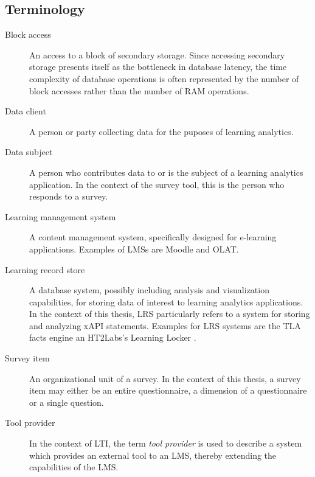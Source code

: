 \subsection{Terminology}
\begin{description}
	\item[Block access] 
		An access to a block of secondary storage. Since accessing secondary storage
		presents itself as the bottleneck in database latency, the time complexity of
		database operations is often represented by the number of block accesses rather
		than the number of RAM operations.
    \item[Data client]
    	A person or party collecting data for the puposes of learning analytics.
    \item[Data subject]
    	A person who contributes data to or is the subject of a learning analytics 
    	application. In the context of the survey tool, this is the person who
    	responds to a survey.
    \item[Learning management system]
	    A content management system, specifically designed for e-learning applications.
	    Examples of LMSs are Moodle and OLAT.
    \item[Learning record store]
    	A database system, possibly including analysis and visualization capabilities, 
	    for storing data of interest to learning analytics applications.
	    In the context of this thesis, LRS particularly refers to a system for storing and analyzing xAPI statements.
    	Examples for LRS systems are the TLA facts engine an HT2Labs's Learning Locker \cite{ht2labs-learninglocker}.
    \item[Survey item]
    	An organizational unit of a survey. In the context of this thesis,
    	a survey item may either be an entire questionnaire, a
    	dimension of a questionnaire or a single question. 
    \item[Tool provider]
	    In the context of LTI, the term \textit{tool provider} is used to describe a
	    system which provides an external tool to an LMS, thereby extending the capabilities of the LMS.
\end{description}